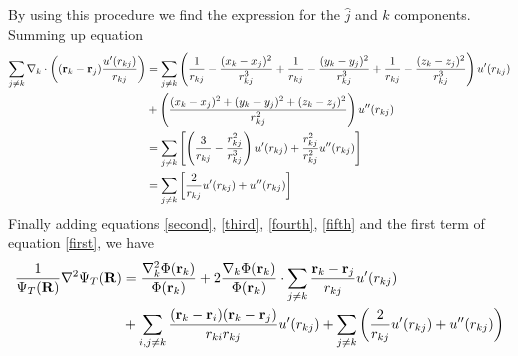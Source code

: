 \documentclass[a4paper,10pt]{article}
\begin{document}
\begin{appendices}
\begin{equation}
\end{equation}
By using this procedure we find the expression for the $\hat{j}$ and $\hat{k}$ components. Summing up equation
\begin{align}
 \sum_{j \neq k} \nabla_k \cdot \left(({\bf r}_k - {\bf r}_j)\frac{u'(r_{kj})}{r_{kj}}\right) 
 &=  \sum_{j \neq k} \left( \frac{1}{r_{kj}} - \frac{(x_k - x_j)^2}{r_{kj}^3} + \frac{1}{r_{kj}} -  \frac{(y_k - y_j)^2}{r_{kj}^3} + \frac{1}{r_{kj}} -  \frac{(z_k - z_j)^2}{r_{kj}^3} \right)u'(r_{kj}) \nonumber \\
 &+ \left( \frac{(x_k - x_j)^2 + (y_k - y_j)^2 + (z_k - z_j)^2}{r_{kj}^2} \right) u''(r_{kj})\nonumber \\
 &= \sum_{j \neq k} \left[\left( \frac{3}{r_{kj}} - \frac{r_{kj}^2}{r_{kj}^3}\right) u'(r_{kj}) + \frac{r_{kj}^2}{r_{kj}^2}u''(r_{kj})\right] \nonumber \\
 &= \sum_{j \neq k} \left[\frac{2}{r_{kj}}u'(r_{kj}) + u''(r_{kj}) \right] \label{fifth}
\end{align}
Finally adding equations \ref{second}, \ref{third}, \ref{fourth}, \ref{fifth} and the first term of equation \ref{first}, we have
\begin{align}
 \frac{1}{\Psi_T({\bf R})}\nabla^2 \Psi_T({\bf R}) &= \frac{\nabla^2_k \Phi({\bf r}_k)}{\Phi({\bf r}_k)} 
 + 2\frac{\nabla_k \Phi({\bf r}_k)}{\Phi({\bf r}_k)}\cdot \sum_{j \neq k} \frac{{\bf r}_k - {\bf r}_j}{r_{kj}}u'(r_{kj}) \nonumber \\
 &+ \sum_{i,j \neq k} \frac{({\bf r}_k - {\bf r}_i)({\bf r}_k - {\bf r}_j)}{r_{ki}r_{kj}}u'(r_{kj}) + \sum_{j \neq k} \left( \frac{2}{r_{kj}} u'(r_{kj}) + u''(r_{kj})\right) \label{analytic laplacian}
\end{align}
\end{appendices}
\end{document}
